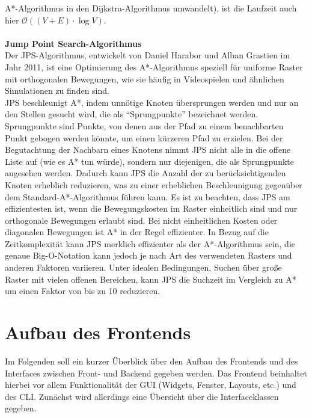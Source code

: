 \begin{itemize}
    A*-Algorithmus in den Dijkstra-Algorithmus umwandelt), ist die Laufzeit auch hier $\mathcal{O}((V+E)\cdot\log V)$.\\\\
    \textbf{Jump Point Search-Algorithmus}\\
    Der  \ac{JPS}-Algorithmus, entwickelt von Daniel Harabor und Alban Grastien im Jahr 2011, ist eine Optimierung des
    A*-Algorithmus speziell für uniforme Raster mit orthogonalen Bewegungen, wie sie häufig in Videospielen und ähnlichen
    Simulationen zu finden sind. \cite{harabor2011}\\
    \ac{JPS} beschleunigt A*, indem unnötige Knoten übersprungen werden und nur an den Stellen gesucht wird, die als ``Sprungpunkte'' bezeichnet werden.
    Sprungpunkte sind Punkte, von denen aus der Pfad zu einem benachbarten Punkt gebogen werden könnte, um einen kürzeren Pfad zu erzielen.
    Bei der Begutachtung der Nachbarn eines Knotens nimmt JPS nicht alle in die offene Liste auf (wie es A* tun würde),
    sondern nur diejenigen, die als Sprungpunkte angesehen werden.
    Dadurch kann JPS die Anzahl der zu berücksichtigenden Knoten erheblich reduzieren, was zu einer erheblichen Beschleunigung
    gegenüber dem Standard-A*-Algorithmus führen kann.
    Es ist zu beachten, dass JPS am effizientesten ist, wenn die Bewegungskosten im Raster einheitlich sind und nur
    orthogonale Bewegungen erlaubt sind.
    Bei nicht einheitlichen Kosten oder diagonalen Bewegungen ist A* in der Regel effizienter.
    In Bezug auf die Zeitkomplexität kann JPS merklich effizienter als der A*-Algorithmus sein, die genaue Big-O-Notation
    kann jedoch je nach Art des verwendeten Rasters und anderen Faktoren variieren.
    Unter idealen Bedingungen, Suchen über große Raster mit vielen offenen Bereichen, kann JPS die Suchzeit im Vergleich
    zu A* um einen Faktor von bis zu 10 reduzieren. \cite{harabor2014}
\end{itemize}
\section{Aufbau des Frontends}
\label{sec:aufbau_frontend}
Im Folgenden soll ein kurzer Überblick über den Aufbau des Frontends und des Interfaces zwischen Front- und Backend gegeben werden.
Das Frontend beinhaltet hierbei vor allem Funktionalität der \ac{GUI} (Widgets, Fenster, Layouts, etc.) und des \ac{CLI}.
Zunächst wird allerdings eine Übersicht über die Interfaceklassen gegeben.
